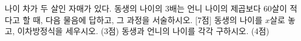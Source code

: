 나이 차가 두 살인 자매가 있다. 동생의 나이의 $3$배는 언니 나이의 제곱보다 $60$살이 적다고 할 때, 다음 물음에 답하고, 그 과정을 서술하시오. \mbox{[7점]}
 동생의 나이를 $x$살로 놓고, 이차방정식을 세우시오. (3점)
 동생과 언니의 나이를 각각 구하시오. (4점)
